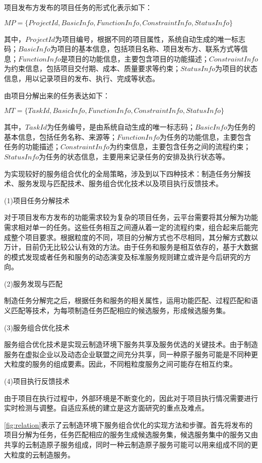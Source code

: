 \documentclass[UTF8]{ctexart}
\begin{document}
项目发布方发布的项目任务的形式化表示如下：

$MP = \{ProjectId, BasicInfo, FunctionInfo, ConstraintInfo, StatusInfo\}$

其中，$ProjectId$为项目编号，根据不同的项目属性，系统自动生成的唯一标志码；$BasicInfo$为项目的基本信息，包括项目名称、项目发布方、联系方式等信息；$FunctionInfo$是项目的功能信息，主要包含项目的功能描述；$ConstraintInfo$为约束信息，包括项目交付期、成本、质量要求等约束；$StatusInfo$为项目的状态信息，用以记录项目的发布、执行、完成等状态。

由项目分解出来的任务表达如下：

$MT = \{TaskId, BasicInfo, FunctionInfo, ConstraintInfo, StatusInfo\}$

其中，$TaskId$为任务编号，是由系统自动生成的唯一标志码；$BasicInfo$为任务的基本信息，包括任务名称、来源等；$FunctionInfo$为任务的功能信息，主要包含任务的功能描述；$ConstraintInfo$为约束信息，主要包含任务之间的流程约束；$StatusInfo$为任务的状态信息，主要用来记录任务的安排及执行状态等。

为实现较好的服务组合优化的全局策略，涉及到以下四种技术：制造任务分解技术、服务发现与匹配技术、服务组合优化技术以及项目执行反馈技术。


(1)项目任务分解技术

对于项目发布方发布的功能需求较为复杂的项目任务，云平台需要将其分解为功能需求相对单一的任务。这些任务相互之间遵从着一定的流程约束，组合起来后能完成整个项目要求。根据粒度的不同，项目的分解方式也不尽相同，其分解方式数以万计，目前仍无比较公认有效的方法。由于任务和服务是相互依存的，基于大数据的模式发现或者任务和服务的动态演变及标准服务规则建立或许是今后研究的方向。

(2)服务发现与匹配

制造任务分解完之后，根据任务和服务的相关属性，运用功能匹配、过程匹配和语义匹配等技术，为每项制造任务匹配相应的候选服务，形成候选服务集。

(3)服务组合优化技术

服务组合优化技术是实现云制造环境下服务共享及服务优选的关键技术。由于制造服务在虚拟企业以及动态企业联盟之间充分共享，同一种原子服务可能是不同种更大粒度的服务的组成要素。因此，不同粗粒度服务之间可能存在相互约束。

(4)项目执行反馈技术

由于项目在执行过程中，外部环境是不断变化的，因此对于项目执行情况需要进行实时检测与调整。自适应系统的建立是这方面研究的重点及难点。

\cref{fig:relation}表示了云制造环境下服务组合优化的实现方法和步骤。首先将发布的项目分解为任务，任务匹配相应的服务生成候选服务集，候选服务集中的服务又由共享的云制造原子服务组成，同时一种云制造原子服务可能可以用来组成不同的更大粒度的云制造服务。
\end{document}
